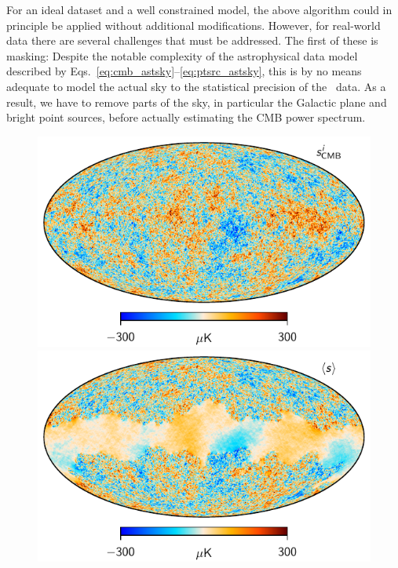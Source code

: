 \documentclass[twocolumn]{aa}
\begin{document}
For an ideal dataset and a well constrained model, the above algorithm
could in principle be applied without additional
modifications. However, for real-world data there are several
challenges that must be addressed. The first of these is masking:
Despite the notable complexity of the astrophysical data model
described by Eqs.~\eqref{eq:cmb_astsky}--\eqref{eq:ptsrc_astsky}, this
is by no means adequate to model the actual sky to the statistical
precision of the \Planck\ data. As a result, we have to remove parts
of the sky, in particular the Galactic plane and bright point sources,
before actually estimating the CMB power spectrum.

\begin{figure}[t]
  \center
  \includegraphics[width=\linewidth]{figs/cmb_BP10_highl_sample.pdf}\\
  \includegraphics[width=\linewidth]{figs/cmb_BP10_highl_mean.pdf}\\

\end{figure}
\end{document}
